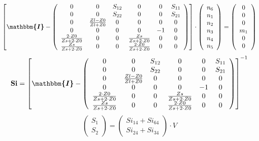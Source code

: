 \[ \left[ \boldsymbol{\mathbbm{I}}  - \left(\begin{array}{cccccc} 0 &
0 & S_{12} & 0 & 0 & S_{11} \\ 0 & 0 & S_{22} & 0 & 0 & S_{21} \\ 0 &
\frac{ Zl -Z0}{ Zl +Z0} & 0 & 0 & 0 & 0 \\ 0 & 0 & 0 & 0 & -1 & 0 \\
\frac{2\cdot Z0}{Zs+2\cdot Z0} & 0 & 0 & \frac{Zs}{Zs+2\cdot Z0} & 0 &
0 \\ \frac{Zs}{Zs+2\cdot Z0} & 0 & 0 & \frac{2\cdot Z0}{Zs+2\cdot Z0}
& 0 & 0 \end{array}\right)\right] \cdot \left(\begin{array}{c} n_{6}
\\ n_{1} \\ n_{2} \\ n_{3} \\ n_{4} \\ n_{5} \end{array}\right) =
\left(\begin{array}{c} 0 \\ 0 \\ 0 \\ m_{1} \\ 0 \\ 0
\end{array}\right) \]
\[ \mathbf{Si} = \left[ \boldsymbol{\mathbbm{I}}  -
\left(\begin{array}{cccccc} 0 & 0 & S_{12} & 0 & 0 & S_{11} \\ 0 & 0 &
S_{22} & 0 & 0 & S_{21} \\ 0 & \frac{ Zl -Z0}{ Zl +Z0} & 0 & 0 & 0 & 0
\\ 0 & 0 & 0 & 0 & -1 & 0 \\ \frac{2\cdot Z0}{Zs+2\cdot Z0} & 0 & 0 &
\frac{Zs}{Zs+2\cdot Z0} & 0 & 0 \\ \frac{Zs}{Zs+2\cdot Z0} & 0 & 0 &
\frac{2\cdot Z0}{Zs+2\cdot Z0} & 0 & 0 \end{array}\right) \right]^{-1}
\]
\[ \left(\begin{array}{c} S_{1} \\ S_{2}
\end{array}\right)=\left(\begin{array}{c} Si_{14} + Si_{64} \\ Si_{24}
+ Si_{34} \end{array}\right)\cdot V \]

